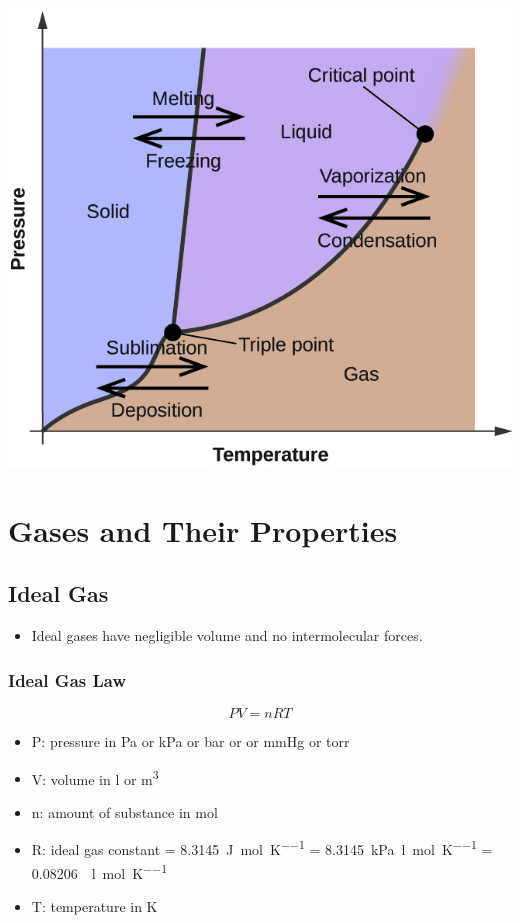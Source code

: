 \documentclass{article}
\begin{document}
\begin{center}
    \includegraphics[scale=0.5]{phase_diagram.jpg}
\end{center}

\section{Gases and Their Properties}

\subsection{Ideal Gas}

\begin{itemize}
    \item Ideal gases have negligible volume and no intermolecular forces.
\end{itemize}

\subsubsection{Ideal Gas Law}

\begin{equation*}
    PV=nRT
\end{equation*}

\begin{itemize}
    \item P: pressure in \si{\pascal} or \si{\kilo\pascal} or \si{\bar} or \si{\atm} or \si{\mmHg} or \si{torr}
    \item V: volume in \si{\litre} or \si{\meter\cubed}
    \item n: amount of substance in \si{\mole}
    \item R: ideal gas constant = \SI[per-mode = fraction]{8.3145}{\joule\per\mole\per\kelvin} = \SI[per-mode = fraction]{8.3145}{\kilo\pascal\litre\per\mole\per\kelvin} = \SI[per-mode = fraction]{0.08206}{\atm\litre\per\mole\per\kelvin}
    \item T: temperature in \si{\kelvin}
\end{itemize}
\end{document}
